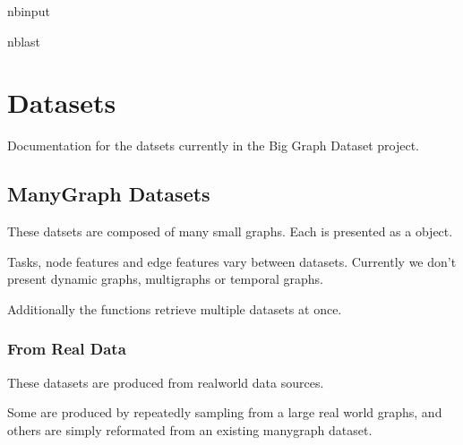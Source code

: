 \documentclass[letterpaper,10pt,english]{sphinxhowto}
\let\sphinxpxdimen\pdfpxdimen\else\newdimen\sphinxpxdimen
\begin{document}
\begin{sphinxuseclass}{nbinput}
\begin{sphinxuseclass}{nblast}
{
\begin{sphinxVerbatim}[commandchars=\\\{\}]
\llap{\color{nbsphinxin}[ ]:\,\hspace{\fboxrule}\hspace{\fboxsep}}
\end{sphinxVerbatim}
}

\end{sphinxuseclass}
\end{sphinxuseclass}

\section{Datasets}
\label{\detokenize{index:datasets}}
\sphinxAtStartPar
Documentation for the datsets currently in the Big Graph Dataset project.

\sphinxstepscope


\subsection{Many\sphinxhyphen{}Graph Datasets}
\label{\detokenize{datasets:many-graph-datasets}}\label{\detokenize{datasets::doc}}
\noindent\sphinxincludegraphics[width=800\sphinxpxdimen]{{datasets}.png}

\sphinxAtStartPar
These datsets are composed of many small graphs.
Each is presented as a  object.

\sphinxAtStartPar
Tasks, node features and edge features vary between datasets.
Currently we don’t present dynamic graphs, multi\sphinxhyphen{}graphs or temporal graphs.

\sphinxAtStartPar
Additionally the functions  retrieve multiple datasets at once.

\sphinxstepscope


\subsubsection{From Real Data}
\label{\detokenize{datasets/real:from-real-data}}\label{\detokenize{datasets/real::doc}}
\sphinxAtStartPar
These datasets are produced from real\sphinxhyphen{}world data sources.

\sphinxAtStartPar
Some are produced by repeatedly sampling from a large real world graphs, and others are simply reformated from an existing many\sphinxhyphen{}graph dataset.
\label{\detokenize{datasets/real:module-datasets.real}}
\end{document}
